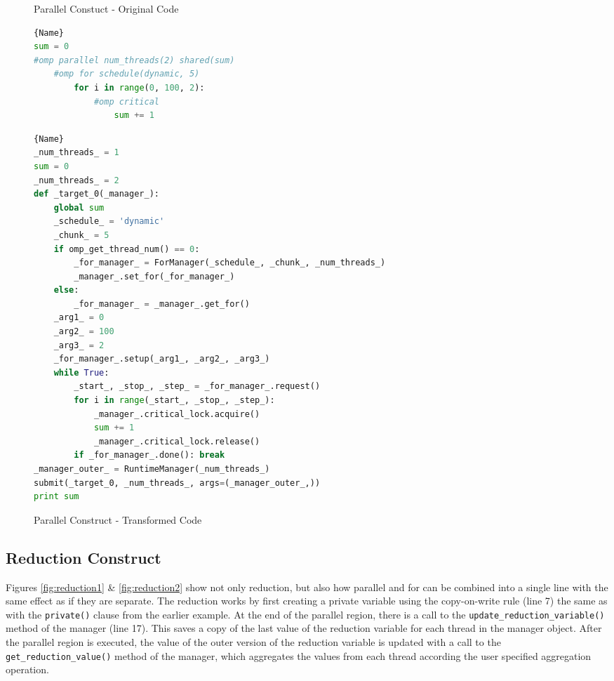 \documentclass[letterpaper,12pt]{article} %
\begin{document}
\begin{figure}[H]
\caption{Parallel Constuct - Original Code}
\label{fig:for1}
\begin{lstlisting}[language=Python]{Name}
sum = 0
#omp parallel num_threads(2) shared(sum)
    #omp for schedule(dynamic, 5)
        for i in range(0, 100, 2):
            #omp critical
                sum += 1
\end{lstlisting}

\caption{Parallel Construct - Transformed Code}
\label{fig:for2}
\begin{lstlisting}[language=Python]{Name}
_num_threads_ = 1
sum = 0
_num_threads_ = 2
def _target_0(_manager_):
    global sum
    _schedule_ = 'dynamic'
    _chunk_ = 5
    if omp_get_thread_num() == 0:
        _for_manager_ = ForManager(_schedule_, _chunk_, _num_threads_)
        _manager_.set_for(_for_manager_)
    else:
        _for_manager_ = _manager_.get_for()
    _arg1_ = 0
    _arg2_ = 100
    _arg3_ = 2
    _for_manager_.setup(_arg1_, _arg2_, _arg3_)
    while True:
        _start_, _stop_, _step_ = _for_manager_.request()
        for i in range(_start_, _stop_, _step_):
            _manager_.critical_lock.acquire()
            sum += 1
            _manager_.critical_lock.release()
        if _for_manager_.done(): break
_manager_outer_ = RuntimeManager(_num_threads_)
submit(_target_0, _num_threads_, args=(_manager_outer_,))
print sum
\end{lstlisting}
\end{figure}


\subsection{Reduction Construct}
Figures \ref{fig:reduction1} \& \ref{fig:reduction2} show not only reduction, but also how parallel and for can be combined into a single line with the same effect as if they are separate. The reduction works by first creating a private variable using the copy-on-write rule (line 7) the same as with the \texttt{private()} clause from the earlier example.  At the end of the parallel region, there is a call to the \texttt{update\_reduction\_variable()} method of the manager (line 17). This saves a copy of the last value of the reduction variable for each thread in the manager object. After the parallel region is executed, the value of the outer version of the reduction variable is updated with a call to the \texttt{get\_reduction\_value()} method of the manager, which aggregates the values from each thread according the user specified aggregation operation. 
\end{document}
